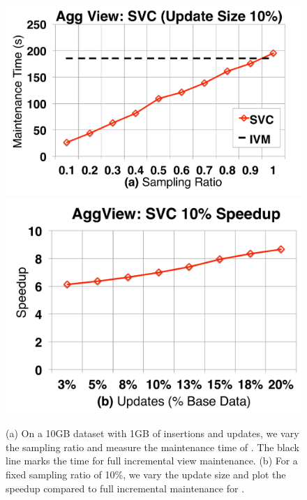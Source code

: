 \begin{figure}[t]\vspace{-2em}
\centering
 \includegraphics[scale=0.13]{exp/msdc_1.pdf}
 \includegraphics[scale=0.13]{exp/msdc_2.pdf}\vspace{-.5em}
   \caption{(a) On a 10GB dataset with 1GB of insertions and updates, we vary the sampling ratio and measure the maintenance time of \svc. The black line marks the time for full incremental view maintenance. (b) For a fixed sampling ratio of 10\%, we vary the update size and plot the speedup compared to full incremental maintenance for \svc.\label{exp2-acc-sample}}
\end{figure}


